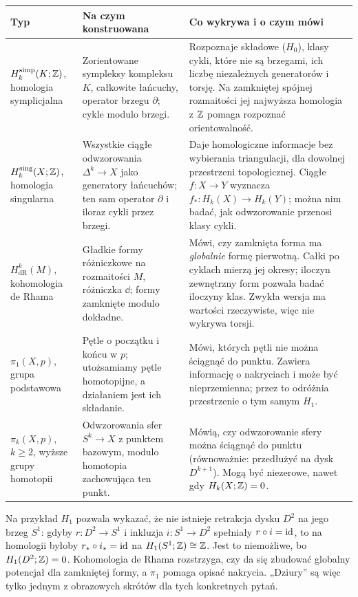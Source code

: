\begin{center}
\small
\renewcommand{\arraystretch}{1.18}
\begin{tabular}{>{\raggedright\arraybackslash}p{3.05cm}
                >{\raggedright\arraybackslash}p{4.4cm}
                >{\raggedright\arraybackslash}p{6.75cm}}
\hline
\textbf{Typ}&\textbf{Na czym konstruowana}&
\textbf{Co wykrywa i o czym mówi}\\
\hline
$H_k^{\mathrm{simp}}(K;\mathbb{Z})$,
homologia symplicjalna&
Zorientowane sympleksy kompleksu $K$,
całkowite łańcuchy, operator brzegu
$\partial$; cykle modulo brzegi.&
Rozpoznaje składowe ($H_0$), klasy cykli,
które nie są brzegami, ich liczbę niezależnych
generatorów i torsję. Na zamkniętej spójnej
rozmaitości jej najwyższa homologia z $\mathbb{Z}$
pomaga rozpoznać orientowalność.\\
\hline
$H_k^{\mathrm{sing}}(X;\mathbb{Z})$,
homologia singularna&
Wszystkie ciągłe odwzorowania
$\Delta^k\to X$ jako generatory łańcuchów;
ten sam operator $\partial$ i iloraz
cykli przez brzegi.&
Daje homologiczne informacje bez wybierania
triangulacji, dla dowolnej przestrzeni
topologicznej. Ciągłe $f:X\to Y$ wyznacza
$f_*:H_k(X)\to H_k(Y)$; można nim badać,
jak odwzorowanie przenosi klasy cykli.\\
\hline
$H^k_{\mathrm{dR}}(M)$,
kohomologia de Rhama&
Gładkie formy różniczkowe na rozmaitości $M$,
różniczka $\dd$; formy zamknięte modulo dokładne.&
Mówi, czy zamknięta forma ma \emph{globalnie}
formę pierwotną. Całki po cyklach mierzą jej
okresy; iloczyn zewnętrzny form pozwala badać
iloczyny klas. Zwykła wersja ma wartości
rzeczywiste, więc nie wykrywa torsji.\\
\hline
$\pi_1(X,p)$,
grupa podstawowa&
Pętle o początku i końcu w $p$;
utożsamiamy pętle homotopijne, a działaniem
jest ich składanie.&
Mówi, których pętli nie można ściągnąć do
punktu. Zawiera informację o nakryciach
i może być nieprzemienna; przez to odróżnia
przestrzenie o tym samym $H_1$.\\
\hline
$\pi_k(X,p)$, $k\geq2$,
wyższe grupy homotopii&
Odwzorowania sfer $S^k\to X$ z punktem
bazowym, modulo homotopia zachowująca
ten punkt.&
Mówią, czy odwzorowanie sfery można
ściągnąć do punktu (równoważnie: przedłużyć
na dysk $D^{k+1}$). Mogą być niezerowe,
nawet gdy $H_k(X;\mathbb{Z})=0$.\\
\hline
\end{tabular}
\end{center}

Na przykład $H_1$ pozwala wykazać, że
nie istnieje retrakcja dysku $D^2$ na jego
brzeg $S^1$: gdyby $r:D^2\to S^1$
i inkluzja $i:S^1\to D^2$ spełniały
$r\circ i=\mathrm{id}$, to na homologii byłoby
$r_*\circ i_*=\mathrm{id}$ na $H_1(S^1;\mathbb{Z})\cong\mathbb{Z}$.
Jest to niemożliwe, bo $H_1(D^2;\mathbb{Z})=0$.
Kohomologia de Rhama rozstrzyga, czy da się
zbudować globalny potencjał dla zamkniętej
formy, a $\pi_1$ pomaga opisać nakrycia.
„Dziury” są więc tylko jednym z obrazowych
skrótów dla tych konkretnych pytań.

